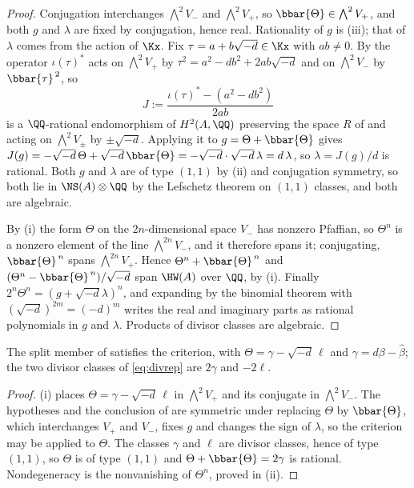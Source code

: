 \begin{proof}
Conjugation interchanges $\bigwedge^{2}V_{-}$ and $\bigwedge^{2}V_{+}$, so
$\bbar{\Theta}\in\bigwedge^{2}V_{+}$, and both $g$ and $\lambda$ are fixed by
conjugation, hence real. Rationality of $g$ is (iii); that of $\lambda$
comes from the action of $\Kx$. Fix
$\tau=a+b\sqrt{-d}\in\Kx$ with $ab\ne0$. By  the operator
$\iota(\tau)^{*}$ acts on $\bigwedge^{2}V_{+}$ by $\tau^{2}=a^{2}-db^{2}+2ab\sqrt{-d}$
and on $\bigwedge^{2}V_{-}$ by $\bbar{\tau}^{\,2}$, so
\[
  J:=\frac{\iota(\tau)^{*}-(a^{2}-db^{2})}{2ab}
\]
is a $\QQ$-rational endomorphism of $H^{2}(A,\QQ)$ preserving the space $R$
of  and acting
on $\bigwedge^{2}V_{\pm}$ by $\pm\sqrt{-d}$. Applying it to
$g=\Theta+\bbar{\Theta}$ gives $J(g)=-\sqrt{-d}\,\Theta+\sqrt{-d}\,\bbar{\Theta}
=-\sqrt{-d}\cdot\sqrt{-d}\,\lambda=d\,\lambda$, so $\lambda=J(g)/d$ is
rational. Both $g$ and $\lambda$ are of type $(1,1)$ by (ii) and conjugation
symmetry, so both lie in $\NS(A)\otimes\QQ$ by the Lefschetz theorem on
$(1,1)$ classes, and both are algebraic.

By (i) the form $\Theta$ on the $2n$-dimensional space $V_{-}$ has nonzero
Pfaffian, so $\Theta^{n}$ is a nonzero element of the line
$\bigwedge^{2n}V_{-}$, and it therefore spans it; conjugating,
$\bbar{\Theta}^{\,n}$ spans $\bigwedge^{2n}V_{+}$. Hence
$\Theta^{n}+\bbar{\Theta}^{\,n}$ and
$(\Theta^{n}-\bbar{\Theta}^{\,n})/\sqrt{-d}$ span $\HW(A)$ over $\QQ$, by
(i). Finally
$2^{n}\Theta^{n}=(g+\sqrt{-d}\lambda)^{n}$, and expanding by the binomial
theorem with $(\sqrt{-d})^{2m}=(-d)^{m}$ writes the real and imaginary parts
as rational polynomials in $g$ and $\lambda$. Products of divisor classes are
algebraic.
\end{proof}

\begin{corollary}\label{cor:splitsatisfies}
The split member of  satisfies the criterion, with
$\Theta=\gamma-\sqrt{-d}\,\ell$ and $\gamma=d\beta-\widehat{\beta}$; the two
divisor classes of \eqref{eq:divrep} are $2\gamma$ and $-2\ell$.
\end{corollary}

\begin{proof}
(i) places $\Theta=\gamma-\sqrt{-d}\,\ell$ in
$\bigwedge^{2}V_{+}$ and its conjugate in $\bigwedge^{2}V_{-}$. The hypotheses
and the conclusion of  are symmetric under replacing
$\Theta$ by $\bbar{\Theta}$, which interchanges $V_{+}$ and $V_{-}$, fixes $g$
and changes the sign of $\lambda$, so the criterion may be applied to
$\Theta$. The classes $\gamma$ and $\ell$ are divisor classes, hence of type
$(1,1)$, so $\Theta$ is of type $(1,1)$ and $\Theta+\bbar{\Theta}=2\gamma$ is
rational. Nondegeneracy is the nonvanishing of $\Theta^{n}$, proved in
(ii).
\end{proof}

